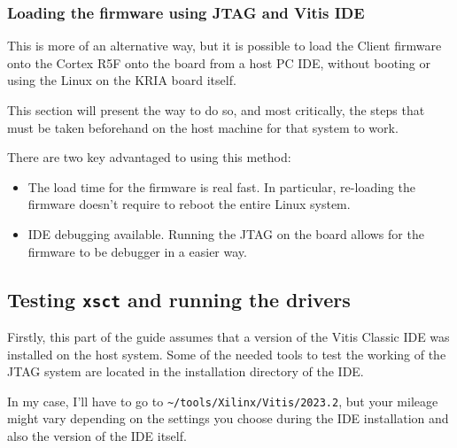 \documentclass[10pt]{article}
\begin{document}
\clearpage
\subsubsection{Loading the firmware using JTAG and Vitis IDE}
\label{sec:org040b75c}
This is more of an alternative way, but it is possible to load the Client
firmware onto the Cortex R5F onto the board from a host PC IDE, without booting or
using the Linux on the KRIA board itself.

This section will present the way to do so, and most critically, the steps that must
be taken beforehand on the host machine for that system to work.

There are two key advantaged to using this method:
\begin{itemize}
\item The load time for the firmware is real fast. In particular, re-loading the
firmware doesn't require to reboot the entire Linux system.
\item IDE debugging available. Running the JTAG on the board allows for the firmware
to be debugger in a easier way.
\end{itemize}

\subsection{Testing \texttt{xsct} and running the drivers}
\label{sec:org379ece1}
Firstly, this part of the guide assumes that a version of the Vitis Classic IDE
was installed on the host system. Some of the needed tools to test the working of the JTAG
system are located in the installation directory of the IDE.

In my case, I'll have to go to \texttt{\textasciitilde{}/tools/Xilinx/Vitis/2023.2}, but your mileage might vary
depending on the settings you choose during the IDE installation and also the version of
the IDE itself.
\end{document}
